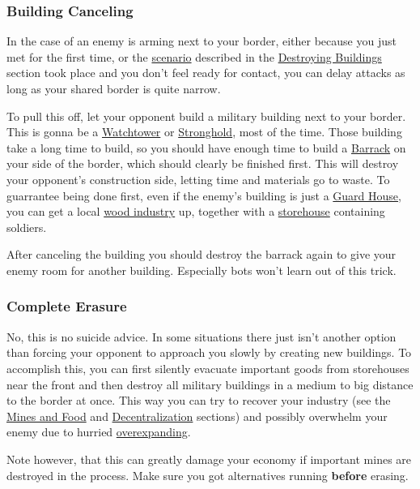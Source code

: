 \documentclass[12pt]{article}
\begin{document}
\subsubsection{Building Canceling}
\label{sec:buildingcanceling}

In the case of an enemy is arming next to your border, either because you just met for the first time, or the \hyperref[wastingenemyresourcesbydestroyingbuildings]{scenario} described in the \hyperref[sec:destroyingbuildings]{Destroying Buildings} section took place and you don't feel ready for contact, you can delay attacks as long as your shared border is quite narrow.

To pull this off, let your opponent build a military building next to your border. This is gonna be a \hyperref[sec:watchtower]{Watchtower} or \hyperref[sec:stronghold]{Stronghold}, most of the time. Those building take a long time to build, so you should have enough time to build a \hyperref[sec:barrack]{Barrack} on your side of the border, which should clearly be finished first. This will destroy your opponent's construction side, letting time and materials go to waste. To guarrantee being done first, even if the enemy's building is just a \hyperref[sec:guardhouse]{Guard House}, you can get a local \hyperref[sec:woodindustry]{wood industry} up, together with a \hyperref[sec:storehouse]{storehouse} containing soldiers.

After canceling the building you should destroy the barrack again to give your enemy room for another building. Especially bots won't learn out of this trick.

\subsubsection{Complete Erasure}
\label{sec:completeerasure}

No, this is no suicide advice. In some situations there just isn't another option than forcing your opponent to approach you slowly by creating new buildings. To accomplish this, you can first silently evacuate important goods from storehouses near the front and then destroy all military buildings in a medium to big distance to the border at once. This way you can try to recover your industry (see the \hyperref[sec:minesandfoot]{Mines and Food} and \hyperref[sec:decentralization]{Decentralization} sections) and possibly overwhelm your enemy due to hurried \hyperref[sec:overexpansion]{overexpanding}.

Note however, that this can greatly damage your economy if important mines are destroyed in the process. Make sure you got alternatives running \textbf{before} erasing.
\end{document}

